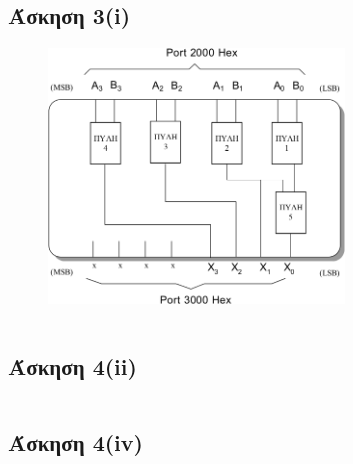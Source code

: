 \documentclass[a4paper,10pt]{article} \usepackage{anysize}
\begin{document}


\section*{} 
\subsection*{Άσκηση 3(i)}
\begin{figure}
\centering
\includegraphics[width=0.7\textwidth]{files/ask_3_i_IC.png}
\end{figure}
\inputminted[linenos,obeytabs,frame=leftline,fontsize=\footnotesize]{oldasm}{../askhsh_3_i.8085}
\pagebreak
\subsection*{Άσκηση 4(ii)}
\inputminted[linenos,obeytabs,frame=leftline,fontsize=\footnotesize]{oldasm}{../askhsh_4_ii.8085}
\pagebreak
\subsection*{Άσκηση 4(iv)}
\inputminted[linenos,obeytabs,frame=leftline,fontsize=\footnotesize]{oldasm}{../askhsh_4_iv.8085}
\pagebreak
\end{document}
